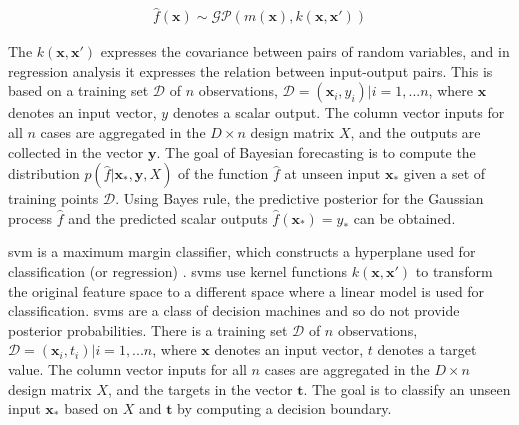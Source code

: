 \documentclass[runningheads,a4paper]{llncs}
\begin{document}


\begin{align} 
\hat{f}(\mathbf{x}) \sim \mathcal{G}\mathcal{P}(m(\mathbf{x}),k(\mathbf{x},\mathbf{x'}))
\end{align}


The $k(\mathbf{x},\mathbf{x'})$ expresses the covariance between pairs of random variables, and in regression analysis it expresses the relation between input-output pairs. This is based on a training set $\mathcal{D}$ of $n$ observations, $\mathcal{D}={(\mathbf{x}_i,y_{i}) | i = 1, ... n} $, where $\mathbf{x}$ denotes an input vector, $y$ denotes a scalar output. The column vector inputs for all $n$ cases are aggregated in the $D \times n$ design matrix $X$, and the outputs are collected in the vector $\mathbf{y}$. The goal of Bayesian forecasting is to compute the distribution $p(\hat{f}|\mathbf{x_*},\mathbf{y},X)$ of the function $\hat{f}$ at unseen input $\mathbf{x_{*}}$ given a set of training points $\mathcal{D}$. Using Bayes rule, the predictive posterior for the Gaussian process $\hat{f}$ and the predicted scalar outputs $\hat{f}(\mathbf{x_*})=y_*$ can be obtained.





\ac{svm} is a maximum margin classifier, which constructs a hyperplane used for classification (or regression) \cite{Bishop:2006:PRM:1162264}. \acp{svm} use kernel functions $k(\mathbf{x},\mathbf{x'})$ to transform the original feature space to a different space where a linear model is used for classification. \acp{svm} are a class of decision machines and so do not provide posterior probabilities. There is a training set $\mathcal{D}$ of $n$ observations, $\mathcal{D}={(\mathbf{x}_i,t_{i}) | i = 1, ... n} $, where $\mathbf{x}$ denotes an input vector, $t$ denotes a target value. The column vector inputs for all $n$ cases are aggregated in the $D \times n$ design matrix $X$, and the targets in the vector $\mathbf{t}$. The goal is to classify an unseen input $\mathbf{x_{*}}$ based on $X$ and $\mathbf{t}$ by computing a decision boundary. 
\end{document}
